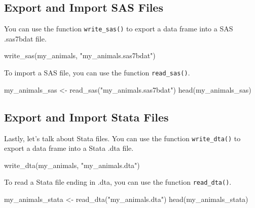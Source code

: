 \documentclass[
]{book}
\newenvironment{Shaded}{\begin{snugshade}}{\end{snugshade}}
\newcommand{\FunctionTok}[1]{\textcolor[rgb]{0.00,0.00,0.00}{#1}}
\newcommand{\NormalTok}[1]{#1}
\newcommand{\OtherTok}[1]{\textcolor[rgb]{0.56,0.35,0.01}{#1}}
\newcommand{\StringTok}[1]{\textcolor[rgb]{0.31,0.60,0.02}{#1}}
\begin{document}
\hypertarget{export-and-import-sas-files}{%
\subsection{Export and Import SAS Files}\label{export-and-import-sas-files}}

You can use the function \texttt{write\_sas()} to export a data frame into a SAS .sas7bdat file.

\begin{Shaded}
\begin{Highlighting}[]
\FunctionTok{write\_sas}\NormalTok{(my\_animals, }\StringTok{"my\_animals.sas7bdat"}\NormalTok{)}
\end{Highlighting}
\end{Shaded}

To import a SAS file, you can use the function \texttt{read\_sas()}.

\begin{Shaded}
\begin{Highlighting}[]
\NormalTok{my\_animals\_sas }\OtherTok{\textless{}{-}} \FunctionTok{read\_sas}\NormalTok{(}\StringTok{"my\_animals.sas7bdat"}\NormalTok{)}
\FunctionTok{head}\NormalTok{(my\_animals\_sas)}
\end{Highlighting}
\end{Shaded}

\hypertarget{export-and-import-stata-files}{%
\subsection{Export and Import Stata Files}\label{export-and-import-stata-files}}

Lastly, let's talk about Stata files. You can use the function \texttt{write\_dta()} to export a data frame into a Stata .dta file.

\begin{Shaded}
\begin{Highlighting}[]
\FunctionTok{write\_dta}\NormalTok{(my\_animals, }\StringTok{"my\_animals.dta"}\NormalTok{)}
\end{Highlighting}
\end{Shaded}

To read a Stata file ending in .dta, you can use the function \texttt{read\_dta()}.

\begin{Shaded}
\begin{Highlighting}[]
\NormalTok{my\_animals\_stata }\OtherTok{\textless{}{-}} \FunctionTok{read\_dta}\NormalTok{(}\StringTok{"my\_animals.dta"}\NormalTok{)}
\FunctionTok{head}\NormalTok{(my\_animals\_stata)}
\end{Highlighting}
\end{Shaded}
\end{document}
